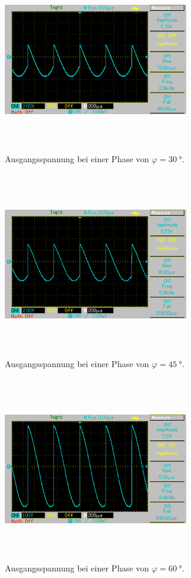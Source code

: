 \begin{figure}
    \centering
    \includegraphics[width=8cm, height=8cm]{build/3.BMP}
    \caption{Ausgangsspannung bei einer Phase von $\varphi = \SI{30}{\degree}$.}
    \label{fig:bild3}
\end{figure}

\begin{figure}
    \centering
    \includegraphics[width=8cm, height=8cm]{build/4.BMP}
    \caption{Ausgangsspannung bei einer Phase von $\varphi = \SI{45}{\degree}$.}
    \label{fig:bild4}
\end{figure}

\begin{figure}
    \centering
    \includegraphics[width=8cm, height=8cm]{build/5.BMP}
    \caption{Ausgangsspannung bei einer Phase von $\varphi = \SI{60}{\degree}$.}
    \label{fig:bild5}
\end{figure}

